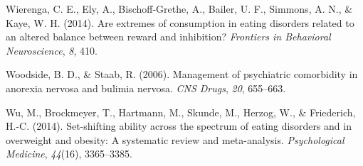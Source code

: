 \documentclass[
  man,floatsintext]{apa6}
\newlength{\cslhangindent}
\newlength{\cslentryspacingunit} %
\newenvironment{CSLReferences}[2] %
 {%
  \setlength{\parindent}{0pt}
  \ifodd #1
  \let\oldpar\par
  \def\par{\hangindent=\cslhangindent\oldpar}
  \fi
  \setlength{\parskip}{#2\cslentryspacingunit}
 }%
 {}
\begin{document}
\begin{CSLReferences}{1}{0}
\leavevmode{}%
Wierenga, C. E., Ely, A., Bischoff-Grethe, A., Bailer, U. F., Simmons, A. N., \& Kaye, W. H. (2014). Are extremes of consumption in eating disorders related to an altered balance between reward and inhibition? \emph{Frontiers in Behavioral Neuroscience}, \emph{8}, 410.

\leavevmode{}%
Woodside, B. D., \& Staab, R. (2006). Management of psychiatric comorbidity in anorexia nervosa and bulimia nervosa. \emph{CNS Drugs}, \emph{20}, 655--663.

\leavevmode{}%
Wu, M., Brockmeyer, T., Hartmann, M., Skunde, M., Herzog, W., \& Friederich, H.-C. (2014). Set-shifting ability across the spectrum of eating disorders and in overweight and obesity: A systematic review and meta-analysis. \emph{Psychological Medicine}, \emph{44}(16), 3365--3385.

\end{CSLReferences}
\end{document}
